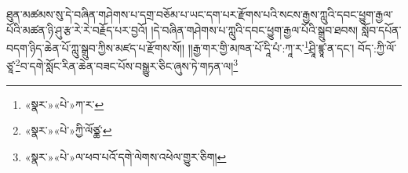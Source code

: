ཐུན་མཚམས་སུ་དེ་བཞིན་གཤེགས་པ་དགྲ་བཅོམ་པ་ཡང་དག་པར་རྫོགས་པའི་སངས་རྒྱས་ཀླུའི་དབང་ཕྱུག་རྒྱལ་པོའི་མཚན་ཉི་ཤུ་རྩ་རེ་རེ་བརྗོད་པར་བྱའོ། །དེ་བཞིན་གཤེགས་པ་ཀླུའི་དབང་ཕྱུག་རྒྱལ་པོའི་སྒྲུབ་ཐབས། སློབ་དཔོན་བདག་ཉིད་ཆེན་པོ་ཀླུ་སྒྲུབ་ཀྱིས་མཛད་པ་རྫོགས་སོ།། །།རྒྱ་གར་གྱི་མཁན་པོ་དཱི་པཾ་:ཀཱ་ར་\footnote{«སྣར་»«པེ་»ཀ་ར་}ཤྲཱི་ཛྙཱ་ན་དང་། བོད་:ཀྱི་ལོ་ཙཱ་\footnote{«སྣར་»«པེ་»ཀྱི་ལོཙྪ་}བ་དགེ་སློང་རིན་ཆེན་བཟང་པོས་བསྒྱུར་ཅིང་ཞུས་ཏེ་གཏན་ལ།\footnote{«སྣར་»«པེ་»ལ་ཕབ་པའོ་དགེ་ལེགས་འཕེལ་གྱུར་ཅིག།} 